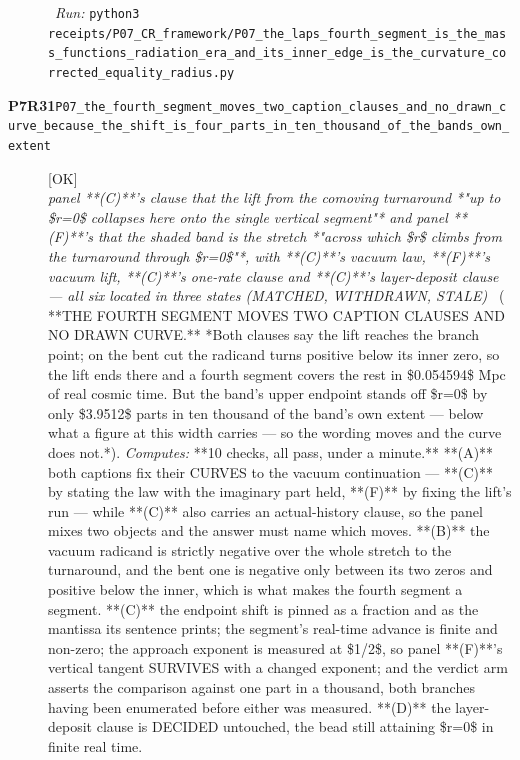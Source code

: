 \begin{description}
\ \emph{Run:} \texttt{python3 receipts/P07\_CR\_framework/P07\_the\_laps\_fourth\_segment\_is\_the\_mass\_functions\_radiation\_era\_and\_its\_inner\_edge\_is\_the\_curvature\_corrected\_equality\_radius.py}
\item[\rcptlabel{P07_the_fourth_segment_moves_two_caption_clauses_and_no_drawn_curve_because_the_shift_is_four_parts_in_ten_thousand_of_the_bands_own_extent}{P7R31}\textbf{P7R31}\quad\texttt{P07\_the\_fourth\_segment\_moves\_two\_caption\_clauses\_and\_no\_drawn\_curve\_because\_the\_shift\_is\_four\_parts\_in\_ten\_thousand\_of\_the\_bands\_own\_extent}]\hfill\textsf{[OK]}\\
\textit{panel **(C)**'s clause that the lift from the comoving turnaround *"up to \$r=0\$ collapses here onto the single vertical segment"* and panel **(F)**'s that the shaded band is the stretch *"across which \$r\$ climbs from the turnaround through \$r=0\$"*, with **(C)**'s vacuum law, **(F)**'s vacuum lift, **(C)**'s one-rate clause and **(C)**'s layer-deposit clause --- all six located in three states (MATCHED, WITHDRAWN, STALE)} \ ( **THE FOURTH SEGMENT MOVES TWO CAPTION CLAUSES AND NO DRAWN CURVE.** *Both clauses say the lift reaches the branch point; on the bent cut the radicand turns positive below its inner zero, so the lift ends there and a fourth segment covers the rest in \$0.054594\$ Mpc of real cosmic time. But the band's upper endpoint stands off \$r=0\$ by only \$3.9512\$ parts in ten thousand of the band's own extent --- below what a figure at this width carries --- so the wording moves and the curve does not.*). 
\emph{Computes:} **10 checks, all pass, under a minute.** **(A)** both captions fix their CURVES to the vacuum continuation --- **(C)** by stating the law with the imaginary part held, **(F)** by fixing the lift's run --- while **(C)** also carries an actual-history clause, so the panel mixes two objects and the answer must name which moves. **(B)** the vacuum radicand is strictly negative over the whole stretch to the turnaround, and the bent one is negative only between its two zeros and positive below the inner, which is what makes the fourth segment a segment. **(C)** the endpoint shift is pinned as a fraction and as the mantissa its sentence prints; the segment's real-time advance is finite and non-zero; the approach exponent is measured at \$1/2\$, so panel **(F)**'s vertical tangent SURVIVES with a changed exponent; and the verdict arm asserts the comparison against one part in a thousand, both branches having been enumerated before either was measured. **(D)** the layer-deposit clause is DECIDED untouched, the bead still attaining \$r=0\$ in finite real time.

\end{description}
